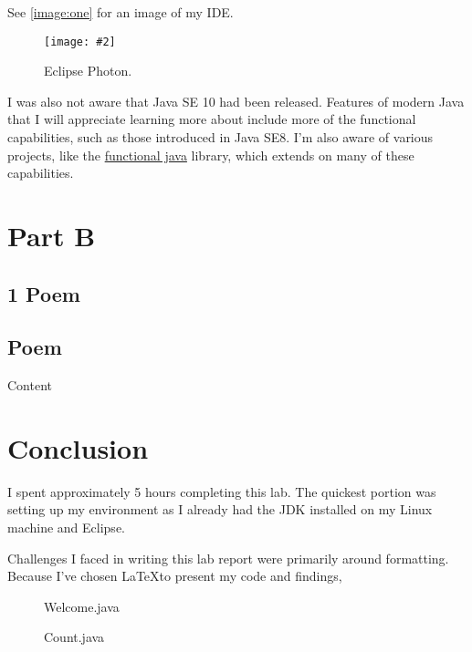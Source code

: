 \documentclass[leqno, 11pt]{article}
\newcommand{\centeredimage}[2]{%
  \begin{center}
    \texttt{[image: \#2]}
  \end{center}
}
\begin{document}
See \autoref{image:one} for an image of my IDE.
\begin{figure}[h!]
  \centeredimage{0.34}{photos/ide.png}
  \caption{Eclipse Photon.}
  \label{image:one}
\end{figure}

I was also not aware that Java SE 10 had been released. Features of modern Java
that I will appreciate learning more about include more of the functional
capabilities, such as those introduced in Java SE8. I'm also aware of various
projects, like the \href{https://github.com/functionaljava/functionaljava}{functional java} 
library, which extends on many of these capabilities.
\section*{Part B}
\subsection*{1 Poem}
\setcounter{subsection}{1}
\subsection{Poem}
Content

\section*{Conclusion}
I spent approximately 5 hours completing this lab. The quickest portion was
setting up my environment as I already had the JDK installed on my Linux 
machine and Eclipse.

Challenges I faced in writing this lab report were primarily around formatting.
Because I've chosen \LaTeX to present my code and findings, 
\newpage
\begin{figure}[t!]
  \centering
  
  \caption{Welcome.java}
  \label{fig:one}
\end{figure}

\begin{figure}
  \centering
  
  \caption{Count.java}
  \label{fig:two}
\end{figure}

%  
\end{document}
